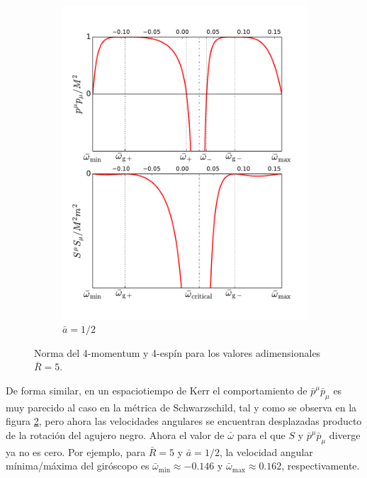 \begin{figure}[!ht]
\begin{subfigure}{0.45\textwidth}
\includegraphics[width=\textwidth]{images/grafico-kerr}
\caption{$\bar{a}=1/2$}
\label{fig:3}
\end{subfigure}
\caption[Norma del 4-momentum en espaciotiempo curvo]{\small{Norma del 4-momentum y 4-espín para los valores adimensionales $\bar{R} = 5$.}}
\end{figure}

De forma similar, en un espaciotiempo de Kerr el comportamiento de $\bar{p}^{\mu} \bar{p}_{\mu}$ es muy parecido al caso en la métrica de Schwarzschild, tal y como se observa en la figura \ref{fig:3}, pero ahora las velocidades angulares se encuentran desplazadas producto de la rotación del agujero negro. Ahora el valor de $\bar{\omega}$ para el que $S$ y $\bar{p}^{\mu} \bar{p}_{\mu}$ diverge ya no es cero. Por ejemplo, para $\bar{R} = 5$ y $\bar{a} = 1/2$, la velocidad angular mínima/máxima del giróscopo es $\bar{\omega}_{\mathrm{min}} \approx -0.146$ y $\bar{\omega}_{\mathrm{max}} \approx 0.162$, respectivamente.

